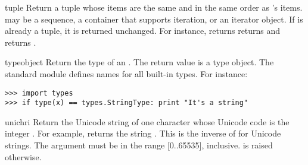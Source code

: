 \begin{funcdesc}{tuple}{}
  Return a tuple whose items are the same and in the same order as
  's items.   may be a sequence, a
  container that supports iteration, or an iterator object.
  If  is already a tuple, it
  is returned unchanged.  For instance,  returns
  returns  and  returns
  .
\end{funcdesc}

\begin{funcdesc}{type}{object}
  Return the type of an .  The return value is a
  type object.  The standard module
   defines names for all built-in
  types.
  For instance:

\begin{verbatim}
>>> import types
>>> if type(x) == types.StringType: print "It's a string"
\end{verbatim}
\end{funcdesc}

\begin{funcdesc}{unichr}{i}
  Return the Unicode string of one character whose Unicode code is the
  integer .  For example,  returns the string
  .  This is the inverse of  for Unicode
  strings.  The argument must be in the range [0..65535], inclusive.
   is raised otherwise.
\end{funcdesc}

